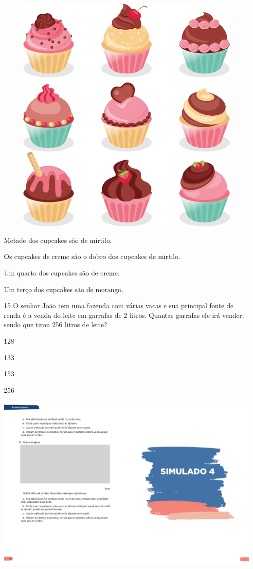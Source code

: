 \begin{figure}[htpb!]
\centering
\includegraphics[width=.5\textwidth]{./media/image150.png}
\end{figure}

\begin{escolha}
\item Metade dos cupcakes são de mirtilo.

\item Os cupcakes de creme são o dobro dos cupcakes de mirtilo.

\item Um quarto dos cupcakes são de creme.

\item Um terço dos cupcakes são de morango.
\end{escolha}


\num{15} O senhor João tem uma fazenda com várias vacas e sua principal fonte de renda é a venda do leite em garrafas de 2 litros. Quantas
garrafas ele irá vender, sendo que tirou 256 litros de leite?

\begin{escolha}
\item 128

\item 133

\item 153

\item 256
\end{escolha}

\vspace*{-3.4cm}
\hspace*{-3.7cm}\includegraphics[scale=1]{../watermarks/4simulado5ano.pdf}

